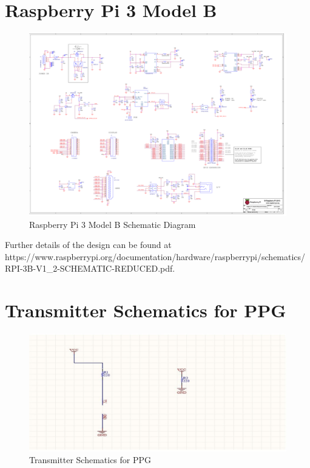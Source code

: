 \section{Raspberry Pi 3 Model B}

\begin{figure}[H]
	\centering
	\includegraphics[width=1.25\linewidth,angle=90,origin=c]{RPI-3B.pdf}
	\caption{Raspberry Pi 3 Model B Schematic Diagram \cite{rpi3hardware}}
	\label{rpi3bschematic}
\end{figure}

Further details of the design can be found at \\ https://www.raspberrypi.org/documentation/hardware/raspberrypi/schematics/RPI-3B-V1\_2-SCHEMATIC-REDUCED.pdf.




\section{Transmitter Schematics for PPG}

\begin{figure}[H]
	\centering
	\includegraphics[width=\linewidth]{georgepic14.jpg}
	\caption{Transmitter Schematics for PPG}
\end{figure}

